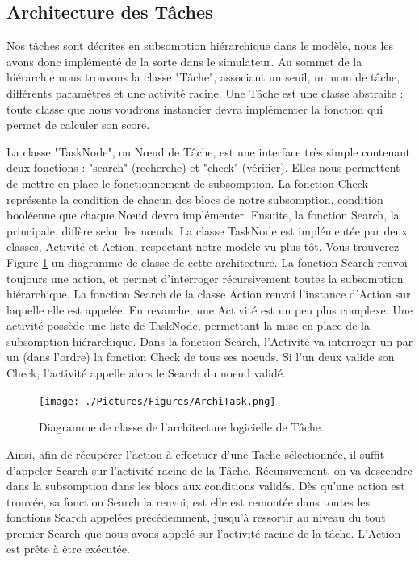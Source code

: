 			\subsection{Architecture des Tâches}
			Nos tâches sont décrites en subsomption hiérarchique dans le modèle, nous les avons donc implémenté de la sorte dans le simulateur. Au sommet de la hiérarchie nous trouvons la classe "Tâche", associant un seuil, un nom de tâche, différents paramètres et une activité racine. Une Tâche est une classe abstraite : toute classe que nous voudrons instancier devra implémenter la fonction qui permet de calculer son score.
			
			La classe "TaskNode", ou Nœud de Tâche, est une interface très simple contenant deux fonctions : "search" (recherche) et "check" (vérifier). Elles nous permettent de mettre en place le fonctionnement de subsomption. La fonction Check représente la condition de chacun des blocs de notre subsomption, condition booléenne que chaque Nœud devra implémenter. Ensuite, la fonction Search, la principale, diffère selon les nœuds. La classe TaskNode est implémentée par deux classes, Activité et Action, respectant notre modèle vu plus tôt. Vous trouverez Figure \ref{ArchiTask} un diagramme de classe de cette architecture. La fonction Search renvoi toujours une action, et permet d'interroger récursivement toutes la subsomption hiérarchique. La fonction Search de la classe Action renvoi l'instance d'Action sur laquelle elle est appelée. En revanche, une Activité est un peu plus complexe. Une activité possède une liste de TaskNode, permettant la mise en place de la subsomption hiérarchique. Dans la fonction Search, l'Activité va interroger un par un (dans l'ordre) la fonction Check de tous ses noeuds. Si l'un deux valide son Check, l'activité appelle alors le Search du noeud validé.
			
			\begin{figure}
			\centering
			\texttt{[image: ./Pictures/Figures/ArchiTask.png]}
			\caption{Diagramme de classe de l'architecture logicielle de Tâche.}
			\label{ArchiTask}
			\end{figure}
			
			Ainsi, afin de récupérer l'action à effectuer d'une Tache sélectionnée, il suffit d'appeler Search sur l'activité racine de la Tâche. Récursivement, on va descendre dans la subsomption dans les blocs aux conditions validés. Dès qu'une action est trouvée, sa fonction Search la renvoi, est elle est remontée dans toutes les fonctions Search appelées précédemment, jusqu'à ressortir au niveau du tout premier Search que nous avons appelé sur l'activité racine de la tâche. L'Action est prête à être exécutée.
			
